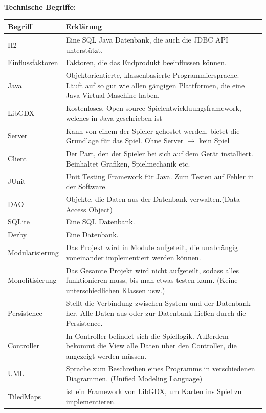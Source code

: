 \documentclass[fontsize=12pt,paper=a4,twoside]{scrartcl}
\begin{document}
\textbf{Technische Begriffe:}
\begin{center}
\begin{tabular}{|p{3cm}|p{12cm}|}
\hline
Begriff & Erklärung \\ \hline
H2 & Eine SQL Java Datenbank, die auch die JDBC API unterstützt. \\ \hline
Einflussfaktoren & Faktoren, die das Endprodukt beeinflussen können. \\ \hline
Java & Objektorientierte, klassenbasierte Programmiersprache. Läuft auf so gut wie allen gängigen Plattformen, die eine Java Virtual Maschine haben.\\ \hline  
LibGDX & Kostenloses, Open-source Spielentwickluungsframework, welches in Java geschrieben ist\\ \hline
Server & Kann von einem der Spieler gehostet werden, bietet die Grundlage für das Spiel. Ohne Server $\rightarrow$ kein Spiel \\ \hline
Client & Der Part, den der Spieler bei sich auf dem Gerät installiert. Beinhaltet Grafiken, Spielmechanik etc. \\ \hline
JUnit & Unit Testing Framework für Java. Zum Testen auf Fehler in der Software.\\ \hline  
DAO & Objekte, die Daten aus der Datenbank verwalten.(Data Access Object)\\ \hline
SQLite & Eine SQL Datenbank. \\ \hline
Derby & Eine Datenbank.\\ \hline
Modularisierung & Das Projekt wird in Module aufgeteilt, die unabhängig voneinander implementiert werden können. \\ \hline  
Monolitisierung & Das Gesamte Projekt wird nicht aufgeteilt, sodass alles funktionieren muss, bis man etwas testen kann. (Keine unterschiedlichen Klassen usw.)\\ \hline
Persistence & Stellt die Verbindung zwischen System und der Datenbank her. Alle Daten aus oder zur Datenbank fließen durch die Persistence.\\ \hline
Controller & In Controller befindet sich die Spiellogik. Außerdem bekommt die View alle Daten über den Controller, die angezeigt werden müssen.\\ \hline
UML & Sprache zum Beschreiben eines Programms in verschiedenen Diagrammen. (Unified Modeling Language)\\ \hline  
TiledMaps & ist ein Framework von LibGDX, um Karten ins Spiel zu implementieren. \\ \hline

 
\end{tabular}
\end{center}
\end{document}
